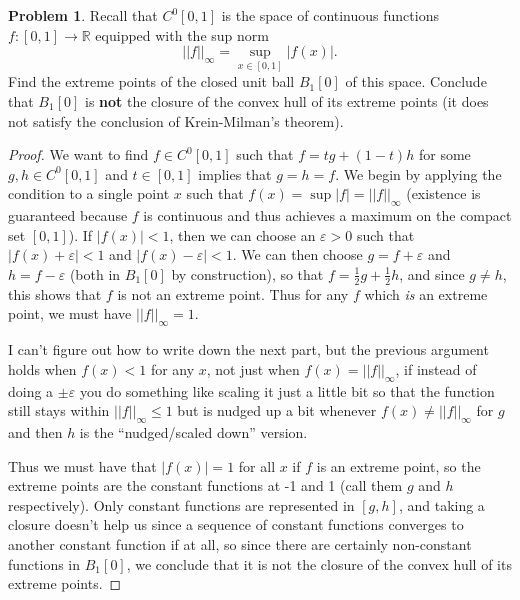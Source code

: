 \documentclass[12pt]{article}
\theoremstyle{definition}
\newtheorem{ex}{Problem}
\begin{document}
\begin{ex}
	Recall that $C^0[0, 1]$ is the space of continuous functions $f : [0, 1] \to \mathbb{R}$ equipped with the sup norm \begin{equation*}
		||f||_\infty = \sup_{x \in [0, 1]}|f(x)|.
	\end{equation*}
	Find the extreme points of the closed unit ball $B_1[0]$ of this space.
	Conclude that $B_1[0]$ is \textbf{not} the closure of the convex hull of its extreme points (it does not satisfy the conclusion of Krein-Milman's theorem).
\end{ex}
\begin{proof}
    We want to find $f \in C^0[0,1]$ such that $f = tg + (1-t)h$ for some $g,h \in C^0[0,1]$ and $t \in [0, 1]$ implies that $g = h = f$.
    We begin by applying the condition to a single point $x$ such that $f(x) = \sup|f| = ||f||_\infty$ (existence is guaranteed because $f$ is continuous and thus achieves a maximum on the compact set $[0, 1]$).
    If $|f(x)| < 1$, then we can choose an $\varepsilon > 0$ such that $|f(x) + \varepsilon| < 1$ and $|f(x) - \varepsilon| < 1$.
    We can then choose $g = f + \varepsilon$ and $h = f - \varepsilon$ (both in $B_1[0]$ by construction), so that $f = \frac{1}{2}g + \frac{1}{2}h$, and since $g \neq h$, this shows that $f$ is not an extreme point.
    Thus for any $f$ which \textit{is} an extreme point, we must have $||f||_\infty = 1$.

    I can't figure out how to write down the next part, but the previous argument holds when $f(x) < 1$ for any $x$, not just when $f(x) = ||f||_\infty$, if instead of doing a $\pm\varepsilon$ you do something like scaling it just a little bit so that the function still stays within $||f||_\infty \leq 1$ but is nudged up a bit whenever $f(x) \neq ||f||_\infty$ for $g$ and then $h$ is the ``nudged/scaled down'' version.

    Thus we must have that $|f(x)| = 1$ for all $x$ if $f$ is an extreme point, so the extreme points are the constant functions at -1 and 1 (call them $g$ and $h$ respectively).
    Only constant functions are represented in $[g, h]$, and taking a closure doesn't help us since a sequence of constant functions converges to another constant function if at all, so since there are certainly non-constant functions in $B_1[0]$, we conclude that it is not the closure of the convex hull of its extreme points.
\end{proof}
\end{document}
